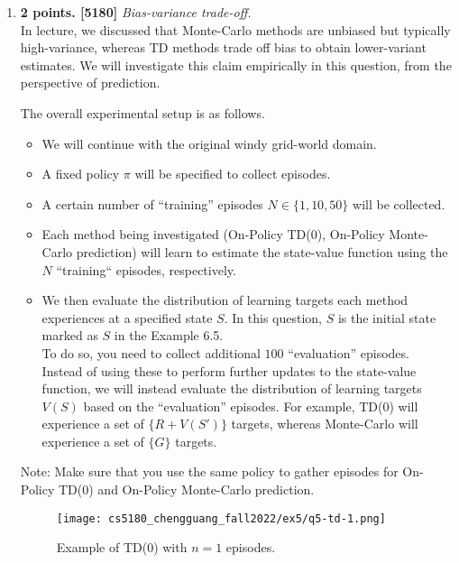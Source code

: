\documentclass{article}
\begin{document}
\begin{enumerate}
	\item \textbf{2 points. [5180]} \textit{Bias-variance trade-off.} \\
	      In lecture, we discussed that Monte-Carlo methods are unbiased but typically high-variance, whereas TD methods trade off bias to obtain lower-variant estimates. We will investigate this claim empirically in this question, from the perspective of prediction.

	      The overall experimental setup is as follows.
	      \begin{itemize}
		      \item We will continue with the original windy grid-world domain.
		      \item A fixed policy $\pi$ will be specified to collect episodes.
		      \item A certain number of ``training'' episodes $N \in \{1, 10, 50\}$ will be collected.
		      \item Each method being investigated (On-Policy TD($0$), On-Policy Monte-Carlo prediction) will learn to estimate the state-value function using the $N$ ``training`` episodes, respectively.
		      \item We then evaluate the distribution of learning targets each method experiences at a specified state $S$. In this question, $S$ is the initial state marked as $S$ in the Example 6.5. \\
		            To do so, you need to collect additional $100$ ``evaluation'' episodes. Instead of using these to perform further updates to the state-value function, we will instead evaluate the distribution of learning targets $V(S)$ based on the ``evaluation'' episodes. For example, TD($0$) will experience a set of $\{R + V(S')\}$ targets, whereas Monte-Carlo will experience a set of $\{G\}$ targets.
	      \end{itemize}
	      Note: Make sure that you use the same policy to gather episodes for On-Policy TD($0$) and On-Policy Monte-Carlo prediction.
       \begin{figure}[h!]
            \centering
            \texttt{[image: cs5180\_chengguang\_fall2022/ex5/q5-td-1.png]}
            \caption{Example of TD(0) with $n=1$ episodes.}
            \label{fig:td0-n50}
        \end{figure}


\end{enumerate}
\end{document}
